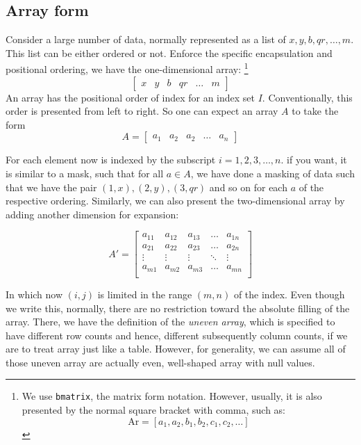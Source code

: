 \subsection{Array form}
Consider a large number of data, normally represented as a list of $x,y,b,qr,\dots,m$. This list can be either ordered or not. Enforce the specific encapsulation and positional ordering, we have the one-dimensional array: \footnote{We use \texttt{bmatrix}, the matrix form notation. However, usually, it is also presented by the normal square bracket with comma, such as: \begin{equation*}
    \mathrm{Ar} = [a_1, a_2, b_1, b_2, c_1, c_2,\dots]
\end{equation*}}
\begin{equation*}
    \begin{bmatrix}
        x& y & b & qr & \dots &m
    \end{bmatrix}
\end{equation*}
An array has the positional order of index for an index set $I$. Conventionally, this order is presented from left to right. So one can expect an array $A$ to take the form
\begin{equation*}
    A = \begin{bmatrix}
        a_1 & a_2 & a_2 & \dots & a_n
    \end{bmatrix}
\end{equation*}

For each element now is indexed by the subscript $i=1,2,3,\dots,n$. if you want, it is similar to a mask, such that for all $a\in A$, we have done a masking of data such that we have the pair $(1,x),(2,y),(3,qr)$ and so on for each $a$ of the respective ordering. Similarly, we can also present the two-dimensional array by adding another dimension for expansion: 

\begin{equation}
    A' = \begin{bmatrix}
        a_{11} & a_{12} & a_{13} & \dots & a_{1n}\\
        a_{21} & a_{22} & a_{23} & \dots & a_{2n}\\
        \vdots & \vdots & \vdots & \ddots & \vdots \\
        a_{m1} & a_{m2} & a_{m3} & \dots & a_{mn}\\
    \end{bmatrix}
\end{equation}

In which now $(i,j)$ is limited in the range $(m,n)$ of the index. Even though we write this, normally, there are no restriction toward the absolute filling of the array. There, we have the definition of the \textit{uneven array}, which is specified to have different row counts and hence, different subsequently column counts, if we are to treat array just like a table. However, for generality, we can assume all of those uneven array are actually even, well-shaped array with null values. 

